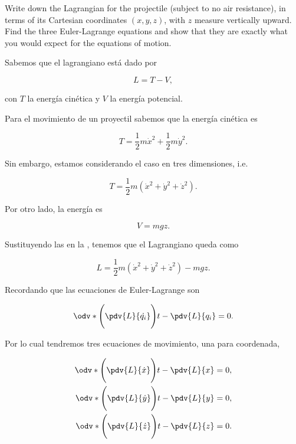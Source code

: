 \documentclass[../main.tex]{subfiles}
\begin{document}
\begin{problema}
	Write down the Lagrangian for the projectile (subject to no air resistance),
	in terms of its Cartesian coordinates \((x, y, z)\), with \(z\) measure
	vertically upward. Find the three Euler-Lagrange equations and show that
	they are exactly what you would expect for the equations of motion.

	\startsolution

	Sabemos que el lagrangiano está dado por

	\begin{equation}
		L = T - V,
		\label{eq:lagrangian-def}
	\end{equation}

	con \(T\) la energía cinética y \(V\) la energía potencial.

	Para el movimiento de un proyectil sabemos que la energía cinética es

	\begin{equation*}
		T = \dfrac{1}{2}m\dot{x}^{2} + \dfrac{1}{2}m\dot{y}^{2}.
	\end{equation*}

	Sin embargo, estamos considerando el caso en tres dimensiones, i.e.

	\begin{equation}
		T = \dfrac{1}{2}m(\dot{x}^{2} + \dot{y}^{2} + \dot{z}^{2}).
		\label{eq:T-p2}
	\end{equation}

	Por otro lado, la energía es

	\begin{equation}
		V = mgz.
		\label{eq:V-p2}
	\end{equation}

	Sustituyendo las  en la ,
	tenemos que el Lagrangiano queda como

	\begin{equation}
		L = \dfrac{1}{2}m(\dot{x}^{2} + \dot{y}^{2} + \dot{z}^{2}) - mgz.
		\label{eq:lagragian-p2}
	\end{equation}

	Recordando que las ecuaciones de Euler-Lagrange son

	\begin{equation*}
		\odv*{\Biggl(\pdv{L}{\dot{q_{i}}}\Biggr)}{t} - \pdv{L}{q_{i}} = 0.
	\end{equation*}

	Por lo cual tendremos tres ecuaciones de movimiento, una para coordenada,

	\begin{align*}
		\odv*{\Biggl(\pdv{L}{\dot{x}}\Biggr)}{t} - \pdv{L}{x} & = 0, \\
		\odv*{\Biggl(\pdv{L}{\dot{y}}\Biggr)}{t} - \pdv{L}{y} & = 0, \\
		\odv*{\Biggl(\pdv{L}{\dot{z}}\Biggr)}{t} - \pdv{L}{z} & = 0.
	\end{align*}


\end{problema}
\end{document}
